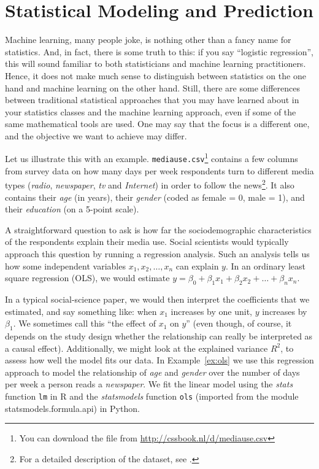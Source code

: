 \section{Statistical Modeling and Prediction}
\label{sec:prediction}
Machine learning, many people joke, is nothing other than a fancy name
for statistics.  And, in fact, there is some truth to this: if you say
``logistic regression'', this will sound familiar to both
statisticians and machine learning practitioners.  Hence, it does not
make much sense to distinguish between statistics on the one hand and
machine learning on the other hand.
Still, there are some differences between traditional statistical
approaches that you may have learned about in your statistics classes
and the machine learning approach, even if 
some of the same
mathematical tools are used. One may say that  the focus is a different
one, and the objective we want to achieve may differ.

Let us illustrate this with an example.
\texttt{mediause.csv}\footnote{You can download the file from
  \url{http://cssbook.nl/d/mediause.csv}} contains a few columns from
survey data on how many days per week respondents turn to different
media types (\emph{radio}, \emph{newspaper}, \emph{tv} and \emph{Internet}) in order to follow the news\footnote{For a detailed
  description of the dataset, see \citet{Trilling2013phd}.}. It also
contains their \emph{age} (in years), their \emph{gender} (coded as female = 0, male = 1), and their \emph{education} (on a 5-point scale).

A straightforward question to ask is how far the
sociodemographic characteristics of the respondents explain their
media use.  Social scientists would typically approach this question
by running a regression analysis.  Such an analysis tells us how some
independent variables $x_1, x_2, \ldots, x_n$ can explain $y$.  In an
ordinary least square regression (OLS), we would estimate $y=\beta_0 +
\beta_1 x_1 + \beta_2 x_2 + \ldots + \beta_n x_n$.

In a typical social-science paper, we would then interpret the coefficients
that we estimated, and say something like: when $x_1$ increases by one unit,
$y$ increases by $\beta_1$.
We sometimes call this ``the effect of $x_1$ on $y$'' (even though, of course,
it depends on the study design whether the relationship can really be interpreted
as a causal effect).
Additionally, we might look at the explained variance $R^2$, to assess how well the model fits our data. In Example~\ref{ex:ols} we use this regression approach to model the relationship of \emph{age} and \emph{gender} over the number of days per week a person reads a \emph{newspaper}. We fit the linear model using the \emph{stats} function \texttt{lm} in R and the \emph{statsmodels} function \texttt{ols} (imported from the module statsmodels.formula.api) in Python.

